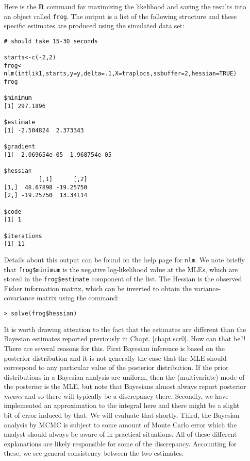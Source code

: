 Here is the {\bf R} command for maximizing the likelihood and saving the
results into an object called \mbox{\tt frog}.  The output is a list of the
following structure and these specific estimates are produced using
the simulated data set:

{\small 
\begin{verbatim}
# should take 15-30 seconds

starts<-c(-2,2)
frog<-nlm(intlik1,starts,y=y,delta=.1,X=traplocs,ssbuffer=2,hessian=TRUE)
frog

$minimum
[1] 297.1896

$estimate
[1] -2.504824  2.373343

$gradient
[1] -2.069654e-05  1.968754e-05

$hessian
          [,1]      [,2]
[1,]  48.67898 -19.25750
[2,] -19.25750  13.34114

$code
[1] 1

$iterations
[1] 11
\end{verbatim}
} 
Details about this output can be found on the help page for
\mbox{\tt nlm}. We note briefly that \mbox{\tt frog\$minimum} is the
negative log-likelihood value at the MLEs, which are stored in the
\mbox{\tt frog\$estimate} component of the list. The Hessian is the
observed Fisher information matrix, which can be inverted to obtain
the variance-covariance matrix using the command:
\begin{verbatim}
> solve(frog$hessian)
\end{verbatim}

It is worth drawing attention to the fact that the estimates are
different than the Bayesian estimates reported previously in
Chapt. \ref{chapt.scr0}.  How can that be?!  There are several reasons
for this.  First Bayesian inference is based on the posterior
distribution and it is not generally the case that the MLE should
correspond to any particular value of the posterior distribution. If
the prior distributions in a Bayesian analysis are uniform, then the
(multivariate) mode of the posterior is the MLE, but note that
Bayesians almost always report posterior {\it means} and so there will
typically be a discrepancy there. Secondly, we have implemented an
approximation to the integral here and there might be a slight bit of
error induced by that. We will evaluate that shortly. Third, the
Bayesian analysis by MCMC is subject to some amount of Monte Carlo
error which the analyst should always be aware of in practical
situations.  All of these different explanations are likely
responsible for some of the discrepancy. Accounting for these, we see
general consistency between the two estimates.

